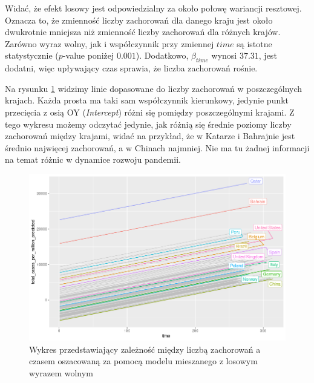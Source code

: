 \documentclass[12pt]{mwbk}
\theoremstyle{plain}
\theoremstyle{definition}
\theoremstyle{definition}
\newcommand\zrodlo[1]{\par\vspace{-3mm}{\small\textit{Źródło: }#1 }}
\begin{document}
Widać, że efekt losowy jest odpowiedzialny za około połowę wariancji resztowej. Oznacza to, że zmienność liczby zachorowań dla danego kraju jest około dwukrotnie mniejsza niż zmienność liczby zachorowań dla różnych krajów.
Zarówno wyraz wolny, jak i współczynnik przy zmiennej $time$ są istotne statystycznie ($p$-value poniżej $0.001$). Dodatkowo, $\beta_{time}$ wynosi $37.31$, jest dodatni, więc upływający czas sprawia, że liczba zachorowań rośnie.



Na rysunku \ref{fig:mod1_predict} widzimy linie dopasowane do liczby zachorowań w poszczególnych krajach. Każda prosta ma taki sam współczynnik kierunkowy, jedynie punkt przecięcia z osią OY (\textit{Intercept}) różni się pomiędzy poszczególnymi krajami. Z tego wykresu możemy odczytać jedynie, jak różnią się średnie poziomy liczby zachorowań między krajami, widać na przykład, że w Katarze i Bahrajnie jest średnio najwięcej zachorowań, a w Chinach najmniej. Nie ma tu żadnej informacji na temat różnic w dynamice rozwoju pandemii.

\newpage

\begin{figure}[!h]
	\centering
	\includegraphics[width=\linewidth]{rys/mod1_predict.png}
	\caption{Wykres przedstawiający zależność między liczbą zachorowań a czasem oszacowaną za pomocą modelu mieszanego z losowym wyrazem wolnym}
	\label{fig:mod1_predict}
	\zrodlo{Opracowanie własne}
\end{figure}
\end{document}
